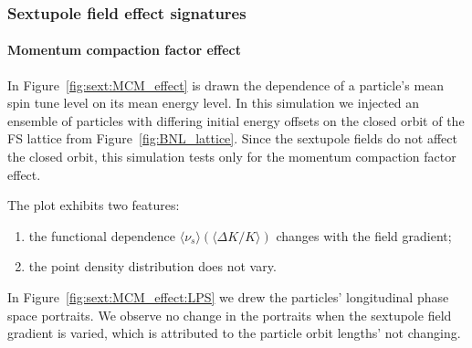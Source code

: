 \documentclass[preprint, review]{elsarticle}
\newcommand{\D}{\Delta}
\newcommand{\avg}[1]{\langle{#1}\rangle}
\begin{document}
\subsubsection{Sextupole field effect signatures}
\paragraph{Momentum compaction factor effect}

In Figure~\ref{fig:sext:MCM_effect} is drawn the dependence of a particle's mean spin tune level
on its mean energy level. In this simulation we injected an ensemble of particles with differing
initial energy offsets on the closed orbit of the FS lattice from Figure~\ref{fig:BNL_lattice}.
Since the sextupole fields do not affect the closed orbit, this simulation tests only for the
momentum compaction factor effect. 

The plot exhibits two features:
\begin{enumerate}[(1)]
\item the functional dependence $\avg{\nu_s}(\avg{\D K/K})$ changes with the field gradient;
  \item the point density distribution does not vary.
\end{enumerate}

In Figure~\ref{fig:sext:MCM_effect:LPS} we drew the particles' longitudinal phase space portraits.
We observe no change in the portraits when the sextupole field gradient is varied,
which is attributed to the particle orbit lengths' not changing.
\end{document}
